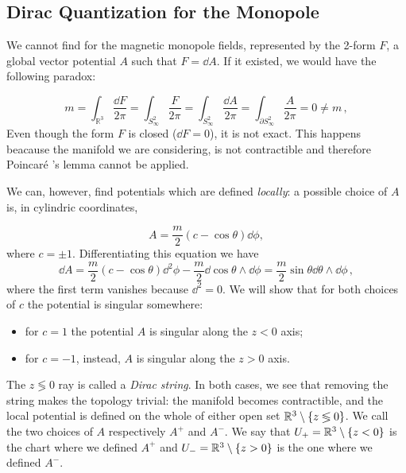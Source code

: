 \documentclass[main.tex]{subfiles}
\begin{document}
\subsection{Dirac Quantization for the Monopole}
We cannot find for the magnetic monopole fields, represented by the 2-form $F$, a global vector potential $A$ such that $F=\dd{A}$.  If it existed, we would have the following paradox:

\begin{equation} \label{eq:different-potentials}
 m= \int_{\mathbb R^3} \frac{\dd{F}}{2\pi} 
= \int_{S^2_\infty} \frac{F}{2 \pi}
 =\int_{S^2_\infty}\frac{\dd{A}}{2\pi}=\int_{\partial S^2_\infty}\frac{A}{2\pi}=0 \neq m\,,
\end{equation}
%
Even though the form \(F\) is closed ($\dd{F}=0$), it is not exact. This happens beacause the manifold we are considering, is not contractible and therefore Poincaré 's lemma cannot be applied.



We can, however, find potentials which are defined \emph{locally}: a possible choice of $A$ is, in cylindric coordinates,

\begin{equation}
A=\frac{m}{2}\left(c-\cos\theta\right)\dd{\phi},
\end{equation}
where $c = \pm 1$. Differentiating this equation we have
%
\begin{equation}
\dd{A}=\frac{m}{2}\left(c-\cos\theta\right)\dd^2\phi-\frac{m}{2}\dd{\cos\theta}\wedge \dd{\phi}=\frac{m}{2}\sin\theta \dd{\theta}\wedge \dd{\phi}\,,
\end{equation}
where the first term vanishes because \(\dd^2 = 0\).
%
We will show that for both choices of $c$ the potential is singular somewhere:
%
\begin{itemize}
\item for $c=1$ the potential \(A\) is singular along the \(z<0\) axis;
\item for $c=-1$, instead, \(A\) is singular along the \(z>0\) axis.
\end{itemize}
%
The \(z \lessgtr 0\) ray is called a \emph{Dirac string}.
%
%
%
In both cases, we see that removing the string makes the topology trivial: the manifold becomes contractible, and the local potential is defined on the whole of either open set $\mathbb{R}^3\setminus \qty{z \lessgtr 0}$.
%
We call the two choices of $A$ respectively $A^+$ and $A^-$.
We say that $U_+ = \mathbb{R}^3 \setminus \qty{z<0}$ is the chart where we defined $A^+$ and $U_- = \mathbb{R}^3 \setminus \qty{z>0}$ is the one where we defined $A^-$.
\end{document}
